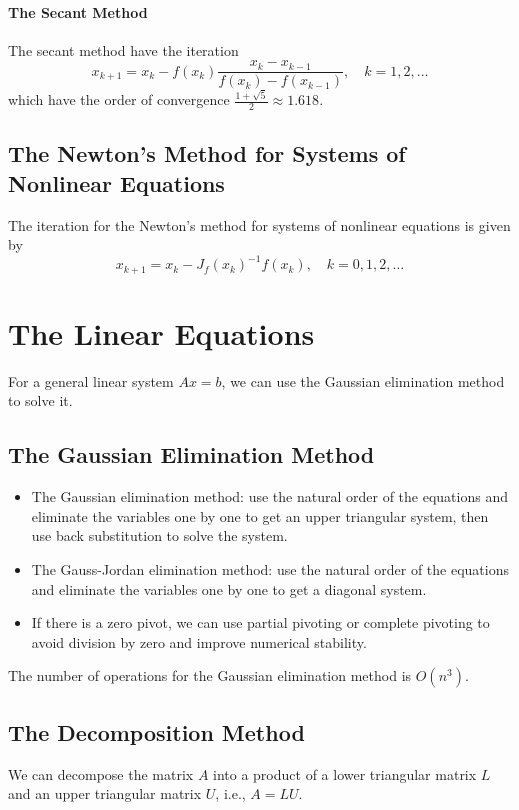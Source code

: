 \documentclass{matharticle}
\begin{document}
\paragraph{The Secant Method}
The secant method have the iteration
\begin{equation}
	x_{k+1} = x_k - f(x_k) \frac{x_k - x_{k-1}}{f(x_k) - f(x_{k-1})}, \quad k = 1, 2, \ldots
\end{equation}
which have the order of convergence $\frac{1 + \sqrt{5}}{2} \approx 1.618$.

\subsection{The Newton's Method for Systems of Nonlinear Equations}
The iteration for the Newton's method for systems of nonlinear equations is given by
\begin{equation}
	x_{k+1} = x_k - J_f(x_k)^{-1} f(x_k), \quad k = 0, 1, 2, \ldots
\end{equation}

\section{The Linear Equations}
For a general linear system $Ax = b$, we can use the Gaussian elimination method to solve it.

\subsection{The Gaussian Elimination Method}
\begin{itemize}
	\item The Gaussian elimination method: use the natural order of the equations and eliminate the variables one by one to get an upper triangular system, then use back substitution to solve the system.
	\item The Gauss-Jordan elimination method: use the natural order of the equations and eliminate the variables one by one to get a diagonal system.
	\item If there is a zero pivot, we can use partial pivoting or complete pivoting to avoid division by zero and improve numerical stability.
\end{itemize}

The number of operations for the Gaussian elimination method is $O(n^3)$.

\subsection{The Decomposition Method}
We can decompose the matrix $A$ into a product of a lower triangular matrix $L$ and an upper triangular matrix $U$, i.e., $A = LU$.
\end{document}
